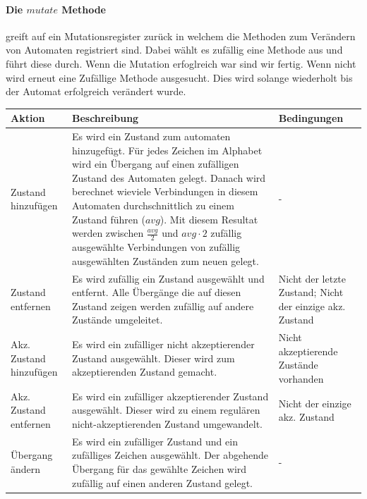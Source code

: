 \paragraph{Die $mutate$ Methode} greift auf ein Mutationsregister zurück in welchem die Methoden zum Verändern von Automaten registriert sind. Dabei wählt es zufällig eine Methode aus und führt diese durch. Wenn die Mutation erfoglreich war sind wir fertig. Wenn nicht wird erneut eine Zufällige Methode ausgesucht. Dies wird solange wiederholt bis der Automat erfolgreich verändert wurde.

\begin{center}
  \begin{tabular}{| l | p{7cm} | p{4cm} |}
    \hline
    \textbf{Aktion} &  \textbf{Beschreibung} & \textbf{Bedingungen}\\
    \hline
    Zustand hinzufügen 
    & Es wird ein Zustand zum automaten hinzugefügt. Für jedes Zeichen im Alphabet wird ein Übergang auf einen zufälligen Zustand des Automaten gelegt. Danach wird berechnet wieviele Verbindungen in diesem Automaten durchschnittlich zu einem Zustand führen ($avg$). Mit diesem Resultat werden zwischen $\frac{avg}{2}$ und $avg \cdot 2$ zufällig ausgewählte Verbindungen von zufällig ausgewählten Zuständen zum neuen gelegt.
    & - \\
    \hline
    Zustand entfernen
    & Es wird zufällig ein Zustand ausgewählt und entfernt. Alle Übergänge die auf diesen Zustand zeigen werden zufällig auf andere Zustände umgeleitet.
    & Nicht der letzte Zustand; Nicht der einzige akz. Zustand \\
    \hline
    Akz. Zustand hinzufügen
    & Es wird ein zufälliger nicht akzeptierender Zustand ausgewählt. Dieser wird zum akzeptierenden Zustand gemacht.
    & Nicht akzeptierende Zustände vorhanden \\
    \hline
    Akz. Zustand entfernen
    & Es wird ein zufälliger akzeptierender Zustand ausgewählt. Dieser wird zu einem regulären nicht-akzeptierenden Zustand umgewandelt.
    & Nicht der einzige akz. Zustand \\
    \hline
    Übergang ändern
    & Es wird ein zufälliger Zustand und ein zufälliges Zeichen ausgewählt. Der abgehende Übergang für das gewählte Zeichen wird zufällig auf einen anderen Zustand gelegt.
    & - \\
    \hline 
  \end{tabular}
\end{center}

